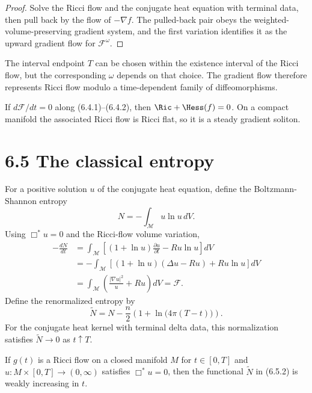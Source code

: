 \begin{proof}
\sketch Solve the Ricci flow and the conjugate heat equation with terminal
data, then pull back by the flow of $-\nabla f$. The pulled-back pair obeys
the weighted-volume-preserving gradient system, and the first variation
identifies it as the upward gradient flow for $\mathcal F^\omega$.
\end{proof}

The interval endpoint $T$ can be chosen within the existence interval of the
Ricci flow, but the corresponding $\omega$ depends on that choice. The
gradient flow therefore represents Ricci flow modulo a time-dependent family
of diffeomorphisms.

\begin{remark}
\label{topping-gradient-flow-steady-soliton-criterion}
If $d\mathcal F/dt=0$ along (6.4.1)--(6.4.2), then
$\Ric+\Hess(f)=0$. On a compact manifold the associated Ricci flow is Ricci
flat, so it is a steady gradient soliton.
\end{remark}

\section{6.5 \quad The classical entropy}

For a positive solution $u$ of the conjugate heat equation, define the
Boltzmann-Shannon entropy
\[
N=-\int_{\mathcal M}u\ln u\,dV.
\]
Using $\Box^*u=0$ and the Ricci-flow volume variation,
\begin{align}
-\frac{dN}{dt}
&=\int_{\mathcal M}\left[(1+\ln u)\frac{\partial u}{\partial t}-Ru\ln u\right]dV \\
&=-\int_{\mathcal M}\left[(1+\ln u)(\Delta u-Ru)+Ru\ln u\right]dV \\
&=\int_{\mathcal M}\left(\frac{|\nabla u|^2}{u}+Ru\right)dV
=\mathcal F. \tag{6.5.1}
\end{align}
Define the renormalized entropy by
\begin{equation}
\widetilde N=N-\frac n2\left(1+\ln\bigl(4\pi(T-t)\bigr)\right). \tag{6.5.2}
\end{equation}
For the conjugate heat kernel with terminal delta data, this normalization
satisfies $\widetilde N\to0$ as $t\uparrow T$.

\begin{lemma}
\label{topping-gradient-flow-classical-entropy-monotone}
If $g(t)$ is a Ricci flow on a closed manifold $M$ for $t\in[0,T]$ and
$u:M\times[0,T]\to(0,\infty)$ satisfies $\Box^*u=0$, then the functional
$\widetilde N$ in (6.5.2) is weakly increasing in $t$.
\end{lemma}

